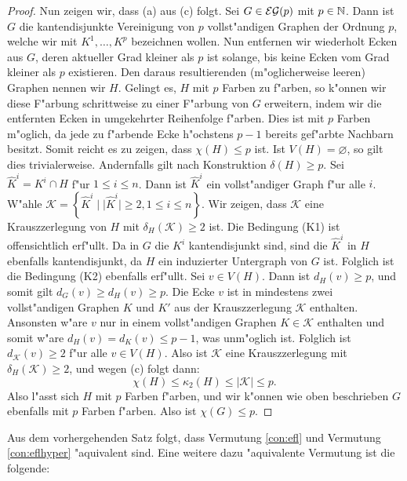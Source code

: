 \begin{proof}
  Nun zeigen wir, dass (a) aus (c) folgt. 
  Sei $G\in {\cal EG}(p) $ mit $p\in {\mathbb{N}}$. Dann ist $G$ die kantendisjunkte Vereinigung von $p$ vollst"andigen Graphen der Ordnung $p$, welche wir mit $K^{1},\dots, K^{p}$ bezeichnen wollen. Nun entfernen wir wiederholt Ecken aus $G$,  deren aktueller Grad kleiner als $p$ ist solange, bis keine Ecken vom Grad kleiner als $p$ existieren. Den daraus resultierenden (m"oglicherweise leeren) Graphen nennen wir $H$. 
  Gelingt es, $H$ mit $p$ Farben zu f"arben, so k"onnen wir diese F"arbung schrittweise zu einer F"arbung von $G$ erweitern, indem wir die entfernten Ecken in umgekehrter Reihenfolge f"arben. Dies ist mit $p$ Farben m"oglich, da jede zu f"arbende Ecke h"ochstens $p-1$ bereits gef"arbte Nachbarn besitzt.
  Somit reicht es zu zeigen, dass $\chi(H) \leq p$ ist. Ist $V(H) =\varnothing$, so gilt dies trivialerweise. Andernfalls gilt nach Konstruktion $\delta(H) \geq p $. 
  Sei $\hat{K}^i = K^{i} \cap H$ f"ur $1\leq i \leq n$. Dann ist $\hat{K}^i$ ein vollst"andiger Graph f"ur alle $i$. W"ahle $\mathcal{K} = \left\{ \hat{K}^i \;|\; | \hat{K}^i| \geq 2  , 1\leq i \leq n\right\}$. Wir zeigen, dass $\mathcal{K}$ eine Krauszzerlegung von $H$ mit $\delta_{H}(\mathcal{K}) \geq 2$ ist.
  Die Bedingung (K1) ist offensichtlich erf"ullt. Da in $G$ die $K^{i}$ kantendisjunkt sind, sind die $\hat{K}^{i}$ in $H$ ebenfalls kantendisjunkt, da $H$ ein induzierter Untergraph von $G$ ist. Folglich ist die Bedingung (K2) ebenfalls erf"ullt. Sei $v\in V(H)$. Dann ist $d_{H}(v) \geq p$, und somit gilt $d_{G}(v) \geq d_H(v) \geq p$. 
  Die Ecke $v$ ist in mindestens zwei vollst"andigen Graphen $K$ und $K'$ aus der Krauszzerlegung $\mathcal{K}$ enthalten. 
  Ansonsten w"are $v$ nur in einem vollst"andigen Graphen $K \in \mathcal{K}$ enthalten und somit w"are $d_{H}(v) = d_{K}(v) \leq p-1$, was unm"oglich ist. 
  Folglich ist $d_{\mathcal{K}}(v) \geq 2$ f"ur alle $v \in V(H)$. Also ist $\mathcal{K}$ eine Krauszzerlegung mit $\delta_{H}(\mathcal{K}) \geq 2$, und wegen (c) folgt dann:
  \begin{equation*}
    \chi(H) \leq \kappa_{2}(H) \leq |\mathcal{K}| \leq p .
  \end{equation*}
  Also l"asst sich $H$ mit $p$ Farben f"arben, und wir k"onnen wie oben beschrieben $G$ ebenfalls mit $p$ Farben f"arben. Also ist $\chi(G) \leq p$.
\end{proof}

Aus dem vorhergehenden Satz folgt, dass Vermutung \ref{con:efl} und Vermutung \ref{con:eflhyper} "aquivalent sind. Eine weitere dazu "aquivalente Vermutung ist die folgende:

